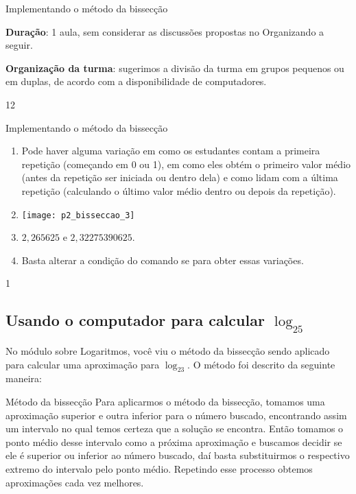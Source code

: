 \begin{sugestions}{Implementando o método da bissecção}
{
\textbf{Duração}: 1 aula, sem considerar as discussões propostas no Organizando a seguir.

\textbf{Organização da turma}: sugerimos a divisão da turma em grupos pequenos ou em duplas, de acordo com a disponibilidade de computadores.
}{1}{2}
\end{sugestions}
\begin{answer}{Implementando o método da bissecção}
{
\begin{enumerate}
\item Pode haver alguma variação em como os estudantes contam a primeira repetição (começando em 0 ou 1), em como eles obtém o primeiro valor médio (antes da repetição ser iniciada ou dentro dela) e como lidam com a última repetição (calculando o último valor médio dentro ou depois da repetição).

\item {}
{
\texttt{[image: p2\_bisseccao\_3]}
}

\item $2{,}265625$ e $2{,}32275390625$.

\item Basta alterar a condição do comando se para obter essas variações.
\end{enumerate}
}{1}
\end{answer}

\subsection{Usando o computador para calcular $\log_25$}

No módulo sobre Logaritmos, você viu o método da bissecção sendo aplicado para calcular uma aproximação para $\log_23$. O método foi descrito da seguinte maneira:

\begin{observationtitle}{Método da bissecção}
Para aplicarmos o método da bissecção, tomamos uma aproximação superior e outra inferior para o número buscado, encontrando assim um intervalo no qual temos certeza que a solução se encontra. Então tomamos o ponto médio desse intervalo como a próxima aproximação e buscamos decidir se ele é superior ou inferior ao número buscado, daí basta substituirmos o respectivo extremo do intervalo pelo ponto médio. Repetindo esse processo obtemos aproximações cada vez melhores.
\end{observationtitle}

